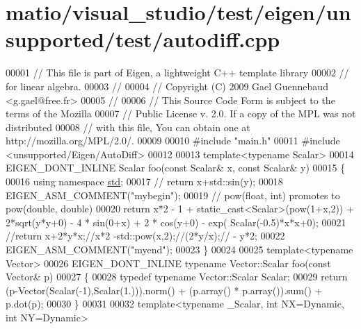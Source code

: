 \hypertarget{matio_2visual__studio_2test_2eigen_2unsupported_2test_2autodiff_8cpp_source}{}\section{matio/visual\+\_\+studio/test/eigen/unsupported/test/autodiff.cpp}
\label{matio_2visual__studio_2test_2eigen_2unsupported_2test_2autodiff_8cpp_source}

\begin{DoxyCode}
00001 \textcolor{comment}{// This file is part of Eigen, a lightweight C++ template library}
00002 \textcolor{comment}{// for linear algebra.}
00003 \textcolor{comment}{//}
00004 \textcolor{comment}{// Copyright (C) 2009 Gael Guennebaud <g.gael@free.fr>}
00005 \textcolor{comment}{//}
00006 \textcolor{comment}{// This Source Code Form is subject to the terms of the Mozilla}
00007 \textcolor{comment}{// Public License v. 2.0. If a copy of the MPL was not distributed}
00008 \textcolor{comment}{// with this file, You can obtain one at http://mozilla.org/MPL/2.0/.}
00009 
00010 \textcolor{preprocessor}{#include "main.h"}
00011 \textcolor{preprocessor}{#include <unsupported/Eigen/AutoDiff>}
00012 
00013 \textcolor{keyword}{template}<\textcolor{keyword}{typename} Scalar>
00014 EIGEN\_DONT\_INLINE Scalar foo(\textcolor{keyword}{const} Scalar& x, \textcolor{keyword}{const} Scalar& y)
00015 \{
00016   \textcolor{keyword}{using namespace }\hyperlink{namespacestd}{std};
00017 \textcolor{comment}{//   return x+std::sin(y);}
00018   EIGEN\_ASM\_COMMENT(\textcolor{stringliteral}{"mybegin"});
00019   \textcolor{comment}{// pow(float, int) promotes to pow(double, double)}
00020   \textcolor{keywordflow}{return} x*2 - 1 + \textcolor{keyword}{static\_cast<}Scalar\textcolor{keyword}{>}(pow(1+x,2)) + 2*sqrt(y*y+0) - 4 * sin(0+x) + 2 * cos(y+0) - exp(
      Scalar(-0.5)*x*x+0);
00021   \textcolor{comment}{//return x+2*y*x;//x*2 -std::pow(x,2);//(2*y/x);// - y*2;}
00022   EIGEN\_ASM\_COMMENT(\textcolor{stringliteral}{"myend"});
00023 \}
00024 
00025 \textcolor{keyword}{template}<\textcolor{keyword}{typename} Vector>
00026 EIGEN\_DONT\_INLINE \textcolor{keyword}{typename} Vector::Scalar foo(\textcolor{keyword}{const} Vector& p)
00027 \{
00028   \textcolor{keyword}{typedef} \textcolor{keyword}{typename} Vector::Scalar Scalar;
00029   \textcolor{keywordflow}{return} (p-Vector(Scalar(-1),Scalar(1.))).norm() + (p.array() * p.array()).sum() + p.dot(p);
00030 \}
00031 
00032 \textcolor{keyword}{template}<\textcolor{keyword}{typename} \_Scalar, \textcolor{keywordtype}{int} NX=Dynamic, \textcolor{keywordtype}{int} NY=Dynamic>

\end{DoxyCode}
